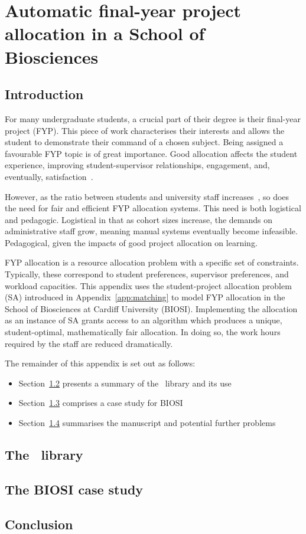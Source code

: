 \chapter{Automatic final-year project allocation in a School of Biosciences}
\label{app:biosci}

\section{Introduction}

For many undergraduate students, a crucial part of their degree is their
final-year project (FYP). This piece of work characterises their interests and
allows the student to demonstrate their command of a chosen subject. Being
assigned a favourable FYP topic is of great importance. Good allocation affects
the student experience, improving student-supervisor relationships, engagement,
and, eventually, satisfaction~\cite{Briffa2018,Kuh2009}.

However, as the ratio between students and university staff
increases~\cite{McDonald2013}, so does the need for fair and efficient FYP
allocation systems. This need is both logistical and pedagogic. Logistical in
that as cohort sizes increase, the demands on administrative staff grow, meaning
manual systems eventually become infeasible. Pedagogical, given the impacts of
good project allocation on learning.

FYP allocation is a resource allocation problem with a specific set of
constraints. Typically, these correspond to student preferences, supervisor
preferences, and workload capacities. This appendix uses the student-project
allocation problem (SA) introduced in Appendix~\ref{app:matching} to model FYP
allocation in the School of Biosciences at Cardiff University (BIOSI).
Implementing the allocation as an instance of SA grants access to an algorithm
which produces a unique, student-optimal, mathematically fair allocation. In
doing so, the work hours required by the staff are reduced dramatically.

The remainder of this appendix is set out as follows:

\begin{itemize}
    \item Section~\ref{sec:matching} presents a summary of the \matching\
        library and its use
    \item Section~\ref{sec:biosi} comprises a case study for BIOSI
    \item Section~\ref{sec:conclusion} summarises the manuscript and potential
        further problems
\end{itemize}

\section{The \matching\ library}\label{sec:matching}



\section{The BIOSI case study}\label{sec:biosi}



\section{Conclusion}\label{sec:conclusion}

